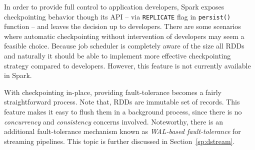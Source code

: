 In order to provide full control to application developers, Spark exposes checkpointing behavior though its API -- via \lstinline$REPLICATE$ flag in \lstinline$persist()$ function -- and leaves the decision up to developers. There are some scenarios where automatic checkpointing without intervention of developers may seem a feasible choice. Because job scheduler is completely aware of the size all RDDs and naturally it should be able to implement more effective checkpointing strategy compared to developers. However, this feature is not currently available in Spark.

With checkpointing in-place, providing fault-tolerance becomes a fairly straightforward process. Note that, RDDs are immutable set of records. This feature makes it easy to flush them in a background process, since there is no \emph{concurrency} and \emph{consistency} concerns involved. Noteworthy, there is an additional fault-tolerance mechanism known as \emph{WAL-based fault-tolerance} for streaming pipelines. This topic is further discussed in Section~\ref{sp:dstream}.
